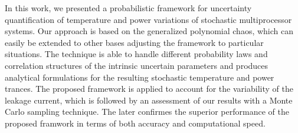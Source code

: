 In this work, we presented a probabilistic framework for uncertainty quantification of temperature and power variations of stochastic multiprocessor systems. Our approach is based on the generalized polynomial chaos, which can easily be extended to other bases adjusting the framework to particular situations. The technique is able to handle different probability laws and correlation structures of the intrinsic uncertain parameters and produces analytical formulations for the resulting stochastic temperature and power trances. The proposed framework is applied to account for the variability of the leakage current, which is followed by an assessment of our results with a Monte Carlo sampling technique. The later confirmes the superior performance of the proposed framwork in terms of both accuracy and computational speed.
